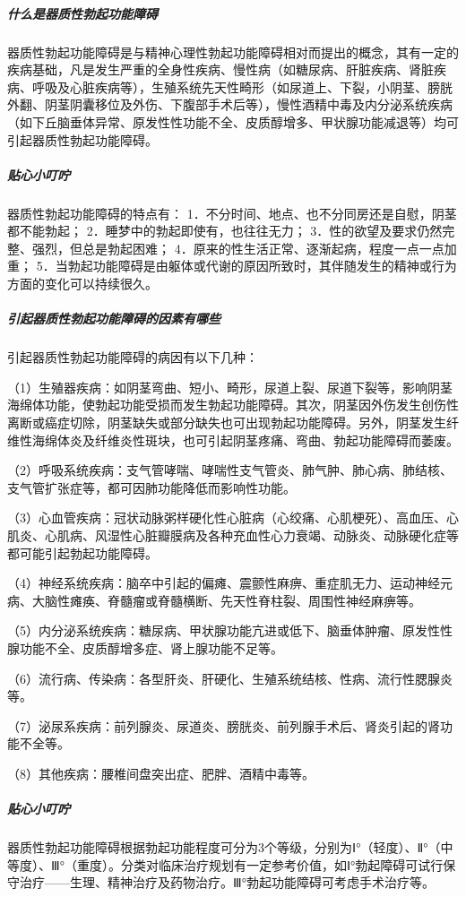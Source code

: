 \subparagraph{什么是器质性勃起功能障碍}

器质性勃起功能障碍是与精神心理性勃起功能障碍相对而提出的概念，其有一定的疾病基础，凡是发生严重的全身性疾病、慢性病（如糖尿病、肝脏疾病、肾脏疾病、呼吸及心脏疾病等），生殖系统先天性畸形（如尿道上、下裂，小阴茎、膀胱外翻、阴茎阴囊移位及外伤、下腹部手术后等），慢性酒精中毒及内分泌系统疾病（如下丘脑垂体异常、原发性性功能不全、皮质醇增多、甲状腺功能减退等）均可引起器质性勃起功能障碍。

\subparagraph{贴心小叮咛}

器质性勃起功能障碍的特点有：
1．不分时间、地点、也不分同房还是自慰，阴茎都不能勃起；
2．睡梦中的勃起即使有，也往往无力；
3．性的欲望及要求仍然完整、强烈，但总是勃起困难；
4．原来的性生活正常、逐渐起病，程度一点一点加重；
5．当勃起功能障碍是由躯体或代谢的原因所致时，其伴随发生的精神或行为方面的变化可以持续很久。

\subparagraph{引起器质性勃起功能障碍的因素有哪些}

引起器质性勃起功能障碍的病因有以下几种：

（1）生殖器疾病：如阴茎弯曲、短小、畸形，尿道上裂、尿道下裂等，影响阴茎海绵体功能，使勃起功能受损而发生勃起功能障碍。其次，阴茎因外伤发生创伤性离断或癌症切除，阴茎缺失或部分缺失也可出现勃起功能障碍。另外，阴茎发生纤维性海绵体炎及纤维炎性斑块，也可引起阴茎疼痛、弯曲、勃起功能障碍而萎废。

（2）呼吸系统疾病：支气管哮喘、哮喘性支气管炎、肺气肿、肺心病、肺结核、支气管扩张症等，都可因肺功能降低而影响性功能。

（3）心血管疾病：冠状动脉粥样硬化性心脏病（心绞痛、心肌梗死）、高血压、心肌炎、心肌病、风湿性心脏瓣膜病及各种充血性心力衰竭、动脉炎、动脉硬化症等都可能引起勃起功能障碍。

（4）神经系统疾病：脑卒中引起的偏瘫、震颤性麻痹、重症肌无力、运动神经元病、大脑性瘫痪、脊髓瘤或脊髓横断、先天性脊柱裂、周围性神经麻痹等。

（5）内分泌系统疾病：糖尿病、甲状腺功能亢进或低下、脑垂体肿瘤、原发性性腺功能不全、皮质醇增多症、肾上腺功能不足等。

（6）流行病、传染病：各型肝炎、肝硬化、生殖系统结核、性病、流行性腮腺炎等。

（7）泌尿系疾病：前列腺炎、尿道炎、膀胱炎、前列腺手术后、肾炎引起的肾功能不全等。

（8）其他疾病：腰椎间盘突出症、肥胖、酒精中毒等。

\subparagraph{贴心小叮咛}

器质性勃起功能障碍根据勃起功能程度可分为3个等级，分别为Ⅰ°（轻度）、Ⅱ°（中等度）、Ⅲ°（重度）。分类对临床治疗规划有一定参考价值，如Ⅰ°勃起障碍可试行保守治疗——生理、精神治疗及药物治疗。Ⅲ°勃起功能障碍可考虑手术治疗等。

